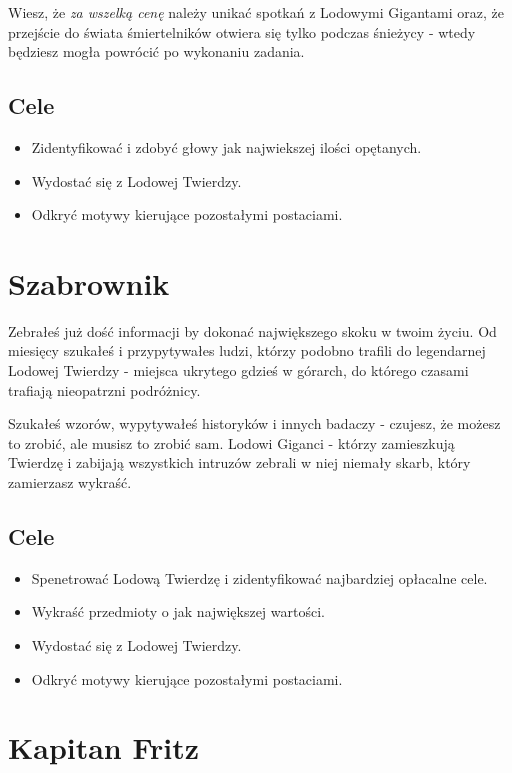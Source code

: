 \documentclass[12pt,a4paper]{article}
\begin{document}
Wiesz, że \emph{za wszelką cenę} należy unikać spotkań z Lodowymi
Gigantami oraz, że przejście do świata śmiertelników otwiera się tylko
podczas śnieżycy - wtedy będziesz mogła powrócić po wykonaniu zadania.

\subsection*{Cele}
\begin{itemize}
\item Zidentyfikować i zdobyć głowy jak najwiekszej ilości opętanych.
\item Wydostać się z Lodowej Twierdzy.
\item Odkryć motywy kierujące pozostałymi postaciami.
\end{itemize}

\clearpage

\section*{Szabrownik}

Zebrałeś już dość informacji by dokonać największego skoku w twoim
życiu. Od miesięcy szukałeś i przypytywałes ludzi, którzy podobno
trafili do legendarnej Lodowej Twierdzy - miejsca ukrytego gdzieś w
górarch, do którego czasami trafiają nieopatrzni podróżnicy.

Szukałeś wzorów, wypytywałeś historyków i innych badaczy - czujesz, że
możesz to zrobić, ale musisz to zrobić sam. Lodowi Giganci - którzy
zamieszkują Twierdzę i zabijają wszystkich intruzów zebrali w niej
niemały skarb, który zamierzasz wykraść.

\subsection*{Cele}
\begin{itemize}
\item Spenetrować Lodową Twierdzę i zidentyfikować najbardziej
  opłacalne cele.
\item Wykraść przedmioty o jak największej wartości.
\item Wydostać się z Lodowej Twierdzy.
\item Odkryć motywy kierujące pozostałymi postaciami.
\end{itemize}

\clearpage

\section*{Kapitan Fritz}
\end{document}
